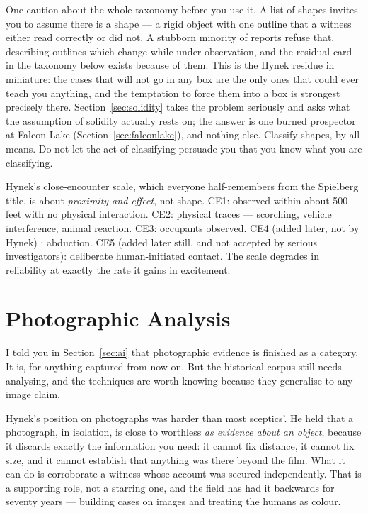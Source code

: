 One caution about the whole taxonomy before you use it. A list of shapes invites you to assume
there is a shape --- a rigid object with one outline that a witness either read correctly or did
not. A stubborn minority of reports refuse that, describing outlines which change while under
observation, and the residual card in the taxonomy below exists because of them. This is the
Hynek residue in miniature: the cases that will not go in any box are the only ones that could
ever teach you anything, and the temptation to force them into a box is strongest precisely
there.
Section~\ref{sec:solidity} takes the problem seriously and asks what the assumption of solidity
actually rests on; the answer is one burned prospector at Falcon Lake
(Section~\ref{sec:falconlake}), and nothing else. Classify shapes, by all means. Do not let the
act of classifying persuade you that you know what you are classifying.

\begin{funfact}
Hynek's close-encounter scale, which everyone half-remembers from the Spielberg title, is
about \emph{proximity and effect}, not shape. CE1: observed within about 500 feet with no
physical interaction. CE2: physical traces --- scorching, vehicle interference, animal
reaction. CE3: occupants observed. CE4 (added later, not by Hynek) : abduction. CE5
(added later still, and not accepted by serious investigators): deliberate human-initiated
contact. The scale degrades in reliability at exactly the rate it gains in excitement.
\end{funfact}



\section{Photographic Analysis}\label{sec:photographicanalysis}

I told you in Section~\ref{sec:ai} that photographic evidence is finished as a category. It
is, for anything captured from now on. But the historical corpus still needs analysing, and
the techniques are worth knowing because they generalise to any image claim.

Hynek's position on photographs was harder than most sceptics'. He held that a photograph, in
isolation, is close to worthless \emph{as evidence about an object}, because it discards exactly
the information you need: it cannot fix distance, it cannot fix size, and it cannot establish that
anything was there beyond the film. What it can do is corroborate a witness whose account was
secured independently. That is a supporting role, not a starring one, and the field has had it
backwards for seventy years --- building cases on images and treating the humans as colour.

